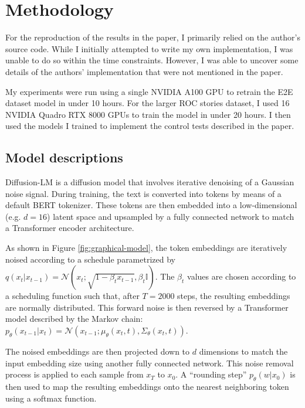 \section{Methodology}


For the reproduction of the results in the paper, I primarily relied on the author's source code. While I initially attempted to write my own implementation, I was unable to do so within the time constraints. However, I was able to uncover some details of the authors' implementation that were not mentioned in the paper.

My experiments were run using a single NVIDIA A100 GPU to retrain the E2E dataset model in under 10 hours. For the larger ROC stories dataset, I used 16 NVIDIA Quadro RTX 8000 GPUs to train the model in under 20 hours. I then used the models I trained to implement the control tests described in the paper.

\subsection{Model descriptions}

Diffusion-LM is a diffusion model that involves iterative denoising of a Gaussian noise signal. During training, the text is converted into tokens by means of a default BERT tokenizer. These tokens are then embedded into a low-dimensional (e.g. $d=16$) latent space and upsampled by a fully connected network to match a Transformer encoder architecture.

As shown in Figure \ref{fig:graphical-model}, the token embeddings are iteratively noised according to a schedule parametrized by $q(x_t | x_{t-1}) = \mathcal{N}(x_t; \sqrt{1-\beta_t x_{t-1}}, \beta_t \mathbb{I})$. The $\beta_t$ values are chosen according to a scheduling function such that, after $T=2000$ steps, the resulting embeddings are normally distributed. This forward noise is then reversed by a Transformer model described by the Markov chain: $p_\theta(x_{t-1}|x_t) = \mathcal{N}(x_{t-1}; \mu_\theta(x_t, t), \Sigma_\theta (x_t, t))$.

The noised embeddings are then projected down to $d$ dimensions to match the input embedding size using another fully connected network. This noise removal process is applied to each sample from $x_T$ to $x_0$. A ``rounding step'' $p_\theta (w|x_0)$ is then used to map the resulting embeddings onto the nearest neighboring token using a softmax function.

